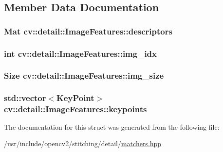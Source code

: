 \subsection{Member Data Documentation}
\hypertarget{structcv_1_1detail_1_1ImageFeatures_ac89a7b84cf2cb861ead1e7634457ba98}{
\subsubsection[{descriptors}]{\setlength{\rightskip}{0pt plus 5cm}Mat cv\-::detail\-::\-Image\-Features\-::descriptors}}\label{structcv_1_1detail_1_1ImageFeatures_ac89a7b84cf2cb861ead1e7634457ba98}
\hypertarget{structcv_1_1detail_1_1ImageFeatures_a323db3650a49ac613aa22e5847d11402}{
\subsubsection[{img\-\_\-idx}]{\setlength{\rightskip}{0pt plus 5cm}int cv\-::detail\-::\-Image\-Features\-::img\-\_\-idx}}\label{structcv_1_1detail_1_1ImageFeatures_a323db3650a49ac613aa22e5847d11402}
\hypertarget{structcv_1_1detail_1_1ImageFeatures_a7a1bb046a17262f873efd09fa990b327}{
\subsubsection[{img\-\_\-size}]{\setlength{\rightskip}{0pt plus 5cm}Size cv\-::detail\-::\-Image\-Features\-::img\-\_\-size}}\label{structcv_1_1detail_1_1ImageFeatures_a7a1bb046a17262f873efd09fa990b327}
\hypertarget{structcv_1_1detail_1_1ImageFeatures_a1defd2a583122cb6360ab12c6333212b}{
\subsubsection[{keypoints}]{\setlength{\rightskip}{0pt plus 5cm}std\-::vector$<$Key\-Point$>$ cv\-::detail\-::\-Image\-Features\-::keypoints}}\label{structcv_1_1detail_1_1ImageFeatures_a1defd2a583122cb6360ab12c6333212b}


The documentation for this struct was generated from the following file\-:\begin{DoxyCompactItemize}
\item 
/usr/include/opencv2/stitching/detail/\hyperlink{matchers_8hpp}{matchers.\-hpp}\end{DoxyCompactItemize}
